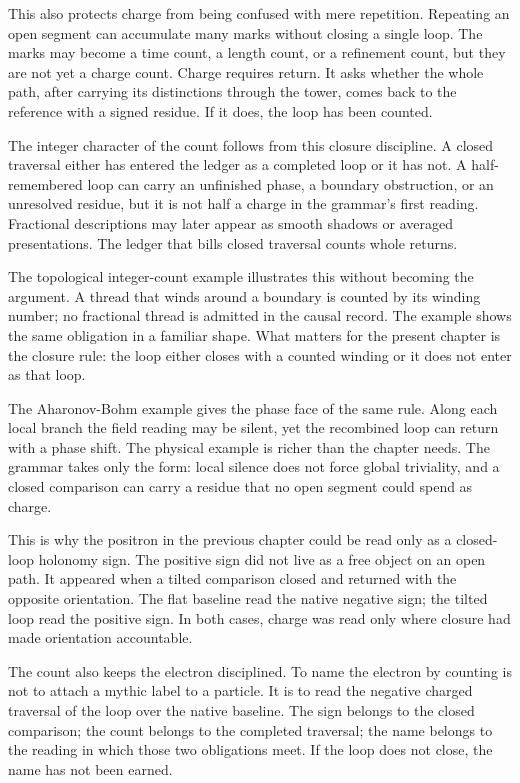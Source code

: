 This also protects charge from being confused with mere repetition. Repeating
an open segment can accumulate many marks without closing a single loop. The
marks may become a time count, a length count, or a refinement count, but
they are not yet a charge count. Charge requires return. It asks whether the
whole path, after carrying its distinctions through the tower, comes back to
the reference with a signed residue. If it does, the loop has been counted.

The integer character of the count follows from this closure discipline. A
closed traversal either has entered the ledger as a completed loop or it has
not. A half-remembered loop can carry an unfinished phase, a boundary
obstruction, or an unresolved residue, but it is not half a charge in the
grammar's first reading. Fractional descriptions may later appear as smooth
shadows or averaged presentations. The ledger that bills closed traversal
counts whole returns.

The topological integer-count example illustrates this without becoming the
argument. A thread that winds around a boundary is counted by its winding
number; no fractional thread is admitted in the causal record. The example
shows the same obligation in a familiar shape. What matters for the present
chapter is the closure rule: the loop either closes with a counted winding
or it does not enter as that loop.

The Aharonov-Bohm example gives the phase face of the same rule. Along each
local branch the field reading may be silent, yet the recombined loop can
return with a phase shift. The physical example is richer than the chapter
needs. The grammar takes only the form: local silence does not force global
triviality, and a closed comparison can carry a residue that no open segment
could spend as charge.

This is why the positron in the previous chapter could be read only as a
closed-loop holonomy sign. The positive sign did not live as a free object on
an open path. It appeared when a tilted comparison closed and returned with
the opposite orientation. The flat baseline read the native negative sign;
the tilted loop read the positive sign. In both cases, charge was read only
where closure had made orientation accountable.

The count also keeps the electron disciplined. To name the electron by
counting is not to attach a mythic label to a particle. It is to read the
negative charged traversal of the loop over the native baseline. The sign
belongs to the closed comparison; the count belongs to the completed
traversal; the name belongs to the reading in which those two obligations
meet. If the loop does not close, the name has not been earned.

